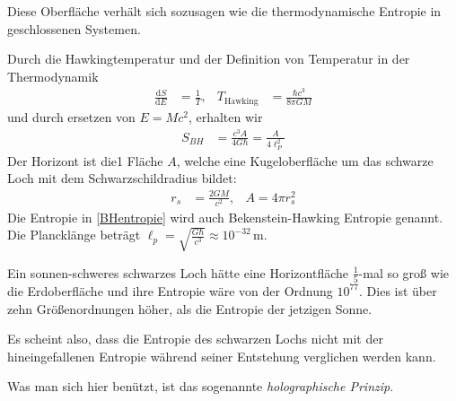 \documentclass[ngerman]{scrartcl}
\newcommand{\diff}{\mathrm{d}}
\begin{document}
	Diese Oberfläche verhält sich sozusagen wie die thermodynamische Entropie in geschlossenen Systemen. 
	
	Durch die Hawkingtemperatur und der Definition von Temperatur in der Thermodynamik
	\begin{align} \label{HawkingTemp}
	\frac{\diff S}{\diff E} &= \frac{1}{T},&
	T_{\text{Hawking}} &= \frac{\hbar c^3}{8 \pi G M}
	\end{align}
	und durch ersetzen von $E = Mc^2$, erhalten wir
	\begin{align} \label{BHentropie}
	S_{BH} &= \frac{c^3 A}{4 G \hbar} = \frac{A}{4 \ell_P^2} 
	\end{align}
	Der Horizont ist die1 Fläche $A$, welche eine Kugeloberfläche um das schwarze Loch mit dem Schwarzschildradius bildet:
	\begin{align} \label{OberflaecheSH}
	r_s &= \frac{2 GM}{c^2} ,& A = 4 \pi r_s^2 
	\end{align}
	Die Entropie in \eqref{BHentropie} wird auch Bekenstein-Hawking Entropie genannt. Die Plancklänge beträgt $\ell_p = \sqrt{\frac{G \hbar}{c^3}} \approx 10^{-32}\,$m.
	
	Ein sonnen-schweres schwarzes Loch hätte eine Horizontfläche $\frac{1}{5}$-mal so groß wie die Erdoberfläche und ihre Entropie wäre von der Ordnung $10^{77}$. Dies ist über zehn Größenordnungen höher, als die Entropie der jetzigen Sonne.  
	
	Es scheint also, dass die Entropie des schwarzen Lochs nicht mit der hineingefallenen Entropie während seiner Entstehung verglichen werden kann.
	
	Was man sich hier benützt, ist das sogenannte \textit{holographische Prinzip}.
	
\end{document}
